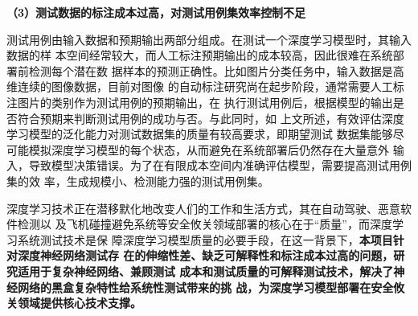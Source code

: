 \textbf{（3）测试数据的标注成本过高，对测试用例集效率控制不足}

测试用例由输入数据和预期输出两部分组成。在测试一个深度学习模型时，其输入数据的样
本空间经常较大，而人工标注预期输出的成本较高，因此很难在系统部署前检测每个潜在数
据样本的预测正确性。比如图片分类任务中，输入数据是高维连续的图像数据，目前对图像
的自动标注研究尚在起步阶段，通常需要人工标注图片的类别作为测试用例的预期输出，在
执行测试用例后，根据模型的输出是否符合预期来判断测试用例的成功与否。与此同时，如
上文所述，有效评估深度学习模型的泛化能力对测试数据集的质量有较高要求，即期望测试
数据集能够尽可能模拟深度学习模型的每个状态，从而避免在系统部署后仍然存在大量意外
输入，导致模型决策错误。为了在有限成本空间内准确评估模型，需要提高测试用例集的效
率，生成规模小、检测能力强的测试用例集。


深度学习技术正在潜移默化地改变人们的工作和生活方式，其在自动驾驶、恶意软件检测以
及飞机碰撞避免系统等安全攸关领域部署的核心在于“质量”，而深度学习系统测试技术是保
障深度学习模型质量的必要手段，在这一背景下，\textbf{本项目针对深度神经网络测试存
    在的伸缩性差、缺乏可解释性和标注成本过高的问题，研究适用于复杂神经网络、兼顾测试
    成本和测试质量的可解释测试技术，解决了神经网络的黑盒复杂特性给系统性测试带来的挑
    战，为深度学习模型部署在安全攸关领域提供核心技术支撑。}


